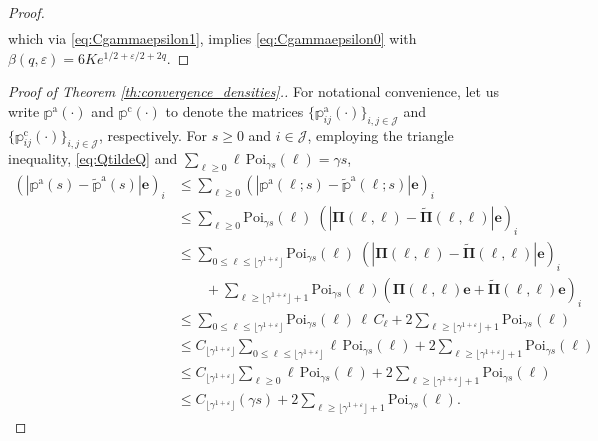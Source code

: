 \documentclass[11pt,leqno]{amsart}
\numberwithin{table}{section}
\numberwithin{figure}{section}
\numberwithin{equation}{section}
\newcommand{\1}{{\mathds{1}}}
\newcommand{\0}{\mat{0}}
\newcommand{\ap}[1]{\mathbb{#1}}
\newcommand{\tld}[1]{\widetilde{#1}}
\newcommand{\apt}[1]{\tld{\mathbb{#1}}}
\begin{document}
{\begin{proof}
\begin{align}
\end{align}
which via \eqref{eq:Cgammaepsilon1}, implies \eqref{eq:Cgammaepsilon0} with { $\beta(q,\varepsilon)= 6Ke^{1/2+\varepsilon/2+2q}$}.
\end{proof}
\begin{proof}[Proof of Theorem \ref{th:convergence_densities}.] { For notational convenience, let us write $\ap{p}^{\mathrm{a}}(\cdot)$ and $\ap{p}^{\mathrm{c}}(\cdot)$ to denote the matrices $\{\ap{p}^{\mathrm{a}}_{ij}(\cdot)\}_{i,j\in\mathcal{J}}$ and $\{\ap{p}^{\mathrm{c}}_{ij}(\cdot)\}_{i,j\in\mathcal{J}}$, respectively.} For $s\ge 0$ and { $i\in\mathcal{J}$}, employing the triangle inequality, \eqref{eq:QtildeQ} and $\sum_{\ell \ge 0}\ell\,\mathrm{Poi}_{\gamma s}(\ell)=\gamma s$,
{
\begin{align*}
\left(\left|\ap{p}^{\mathrm{a}}(s) - \apt{p}^{\mathrm{a}}( s)\right|\bm{e}\right)_i &\le \sum_{\ell\ge 0}\left(\left| \ap{p}^{\mathrm{a}}(\ell; s) - \apt{p}^{\mathrm{a}}(\ell; s)\right|\bm{e}\right)_i\\
&\le \sum_{\ell\ge 0}\mathrm{Poi}_{\gamma s}(\ell)\; \left(\left|\bm{\Pi}(\ell, \ell)-\tld{\bm{\Pi}}(\ell, \ell)\right|\bm{e}\right)_i\\
&\le \sum_{0\le\ell\le\lfloor \gamma^{1+\varepsilon} \rfloor}\mathrm{Poi}_{\gamma s}(\ell)\;\left( \left|\bm{\Pi}(\ell, \ell)-\tld{\bm{\Pi}}(\ell, \ell)\right|\bm{e} \right)_i\\
&\qquad + \sum_{\ell\ge \lfloor \gamma^{1+\varepsilon} \rfloor +1 }\mathrm{Poi}_{\gamma s}(\ell)\left( \bm{\Pi}(\ell, \ell)\bm{e} + \tld{\bm{\Pi}}(\ell, \ell)\bm{e}\right)_i\\
&\le \sum_{0\le\ell\le\lfloor \gamma^{1+\varepsilon} \rfloor}\mathrm{Poi}_{\gamma s}(\ell)\,\ell\,C_\ell + 2\sum_{\ell\ge \lfloor \gamma^{1+\varepsilon} \rfloor +1 }\mathrm{Poi}_{\gamma s}(\ell)\\
&\le C_{\lfloor \gamma^{1+\varepsilon} \rfloor}\sum_{0\le\ell\le\lfloor \gamma^{1+\varepsilon} \rfloor}\ell\,\mathrm{Poi}_{\gamma s}(\ell) + 2\sum_{\ell\ge \lfloor \gamma^{1+\varepsilon} \rfloor +1 }\mathrm{Poi}_{\gamma s}(\ell)\\
&\le C_{\lfloor \gamma^{1+\varepsilon} \rfloor}\sum_{\ell \ge 0}\ell\,\mathrm{Poi}_{\gamma s}(\ell) + 2\sum_{\ell\ge \lfloor \gamma^{1+\varepsilon} \rfloor +1 }\mathrm{Poi}_{\gamma s}(\ell)\\
&\le C_{\lfloor \gamma^{1+\varepsilon} \rfloor}(\gamma s)+ 2\sum_{\ell\ge \lfloor \gamma^{1+\varepsilon} \rfloor +1 }\mathrm{Poi}_{\gamma s}(\ell).
\end{align*}
}
\end{proof}}
\end{document}
